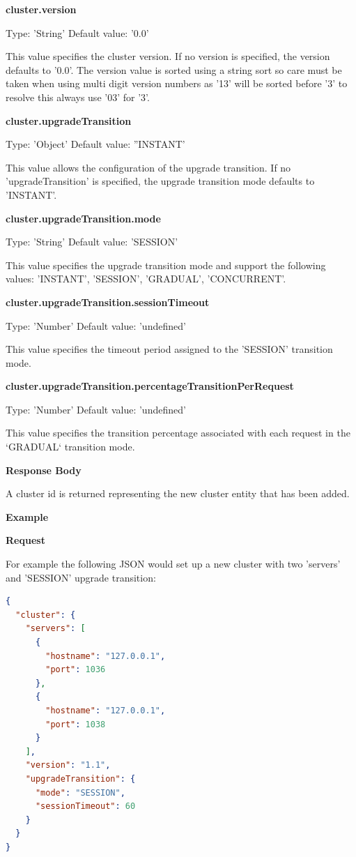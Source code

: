 \documentclass[a4paper,11pt,twoside]{report}
\begin{document}
\noindent
\textbf{cluster.version}

\noindent
Type: 'String' Default value: '0.0'\smallskip

\noindent
This value specifies the cluster version. If no version is specified, the version defaults to '0.0'.  The version value is sorted using a string sort so care must be taken when using multi digit version numbers as '13' will be sorted before '3' to resolve this always use '03' for '3'. \bigskip

\noindent
\textbf{cluster.upgradeTransition}

\noindent
Type: 'Object' Default value: ''INSTANT'\smallskip

\noindent
This value allows the configuration of the upgrade transition. If no 'upgradeTransition' is specified, the upgrade transition mode defaults to 'INSTANT'.\bigskip

\noindent
\textbf{cluster.upgradeTransition.mode}

\noindent
Type: 'String' Default value: 'SESSION'\smallskip

\noindent
This value specifies the upgrade transition mode and support the following values: 'INSTANT', 'SESSION', 'GRADUAL', 'CONCURRENT'.\bigskip

\noindent
\textbf{cluster.upgradeTransition.sessionTimeout}

\noindent
Type: 'Number' Default value: 'undefined'\smallskip

\noindent
This value specifies the timeout period assigned to the 'SESSION' transition mode. \bigskip

\noindent
\textbf{cluster.upgradeTransition.percentageTransitionPerRequest}

\noindent
Type: 'Number' Default value: 'undefined'\smallskip

\noindent
This value specifies the transition percentage associated with each request in the `GRADUAL` transition mode. \bigskip

\noindent
\textbf{Response Body}

\noindent
A cluster id is returned representing the new cluster entity that has been added. \bigskip

\noindent
\textbf{Example}\bigskip

\noindent
\textbf{Request}

\noindent
For example the following JSON would set up a new cluster with two 'servers' and 'SESSION' upgrade transition:\bigskip

\begin{lstlisting}[language=json]
{
  "cluster": {
    "servers": [
      {
        "hostname": "127.0.0.1", 
        "port": 1036
      },  
      {
        "hostname": "127.0.0.1", 
        "port": 1038
      }
    ], 
    "version": "1.1", 
    "upgradeTransition": {
      "mode": "SESSION", 
      "sessionTimeout": 60
    }
  }
}
\end{lstlisting}
\end{document}
